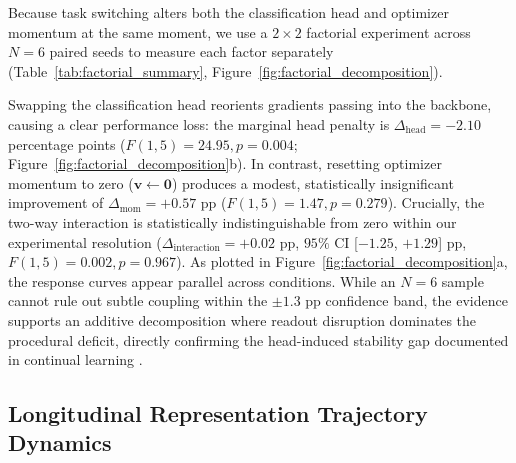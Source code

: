 \documentclass[10pt]{article}
\begin{document}
Because task switching alters both the classification head and optimizer momentum at the same moment, we use a $2 \times 2$ factorial experiment across $N = 6$ paired seeds to measure each factor separately (Table~\ref{tab:factorial_summary}, Figure~\ref{fig:factorial_decomposition}). 

Swapping the classification head reorients gradients passing into the backbone, causing a clear performance loss: the marginal head penalty is $\Delta_{\mathrm{head}} = -2.10$ percentage points ($F(1, 5) = 24.95, p = 0.004$; Figure~\ref{fig:factorial_decomposition}b). In contrast, resetting optimizer momentum to zero ($\bm{v} \leftarrow \mathbf{0}$) produces a modest, statistically insignificant improvement of $\Delta_{\mathrm{mom}} = +0.57$ pp ($F(1, 5) = 1.47, p = 0.279$). Crucially, the two-way interaction is statistically indistinguishable from zero within our experimental resolution ($\Delta_{\mathrm{interaction}} = +0.02$ pp, $95\%$ CI [$-1.25$, $+1.29$] pp, $F(1, 5) = 0.002, p = 0.967$). As plotted in Figure~\ref{fig:factorial_decomposition}a, the response curves appear parallel across conditions. While an $N = 6$ sample cannot rule out subtle coupling within the $\pm 1.3$ pp confidence band, the evidence supports an additive decomposition where readout disruption dominates the procedural deficit, directly confirming the head-induced stability gap documented in continual learning \cite{lapacz2025exploring}.

\subsection{Longitudinal Representation Trajectory Dynamics}\label{subsec:results_representations}
\end{document}
